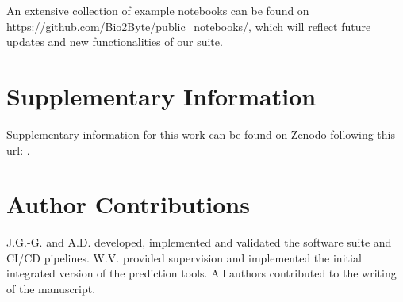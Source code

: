 An extensive collection of example notebooks can be found on \url{https://github.com/Bio2Byte/public_notebooks/}, which will reflect future updates and new functionalities of our suite.

\section*{Supplementary Information}
Supplementary information for this work can be found on Zenodo following this url: .

\section*{Author Contributions}
J.G.-G. and A.D. developed, implemented and validated the software suite and CI/CD pipelines.
W.V. provided supervision and implemented the initial integrated version of the prediction tools.
All authors contributed to the writing of the manuscript.




